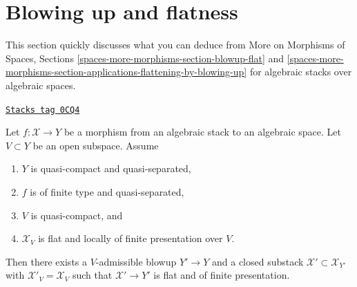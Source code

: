 \section{Blowing up and flatness}
\label{stacks-more-morphisms-section-blowup-flat}
This section quickly discusses what you can deduce from
More on Morphisms of Spaces, Sections
\ref{spaces-more-morphisms-section-blowup-flat} and
\ref{spaces-more-morphisms-section-applications-flattening-by-blowing-up}
for algebraic stacks over algebraic spaces.

\begin{lemma}
\label{stacks-more-morphisms-lemma-flatten-stack}
\href{https://stacks.math.columbia.edu/tag/0CQ4}{\texttt{Stacks tag 0CQ4}}

Let $f : \mathcal{X} \to Y$ be a morphism from an algebraic stack
to an algebraic space. Let $V \subset Y$ be an open subspace. Assume
\begin{enumerate}
\item $Y$ is quasi-compact and quasi-separated,
\item $f$ is of finite type and quasi-separated,
\item $V$ is quasi-compact, and
\item $\mathcal{X}_V$ is flat and locally of finite presentation over $V$.
\end{enumerate}
Then there exists a $V$-admissible blowup $Y' \to Y$
and a closed substack $\mathcal{X}' \subset \mathcal{X}_{Y'}$
with $\mathcal{X}'_V = \mathcal{X}_V$ such that
$\mathcal{X}' \to Y'$ is flat and of finite presentation.
\end{lemma}

